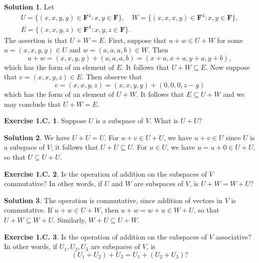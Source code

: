 \documentclass[12pt]{article}
\theoremstyle{definition}
\theoremstyle{exercise}
\newtheorem{exercise}{Exercise 1.C.}
\theoremstyle{solution}
\newtheorem*{solution}{Solution}
\newcommand{\F}{\mathbf{F}}
\begin{document}
\begin{solution}
    Let
    \begin{gather*}
        U = \{ (x, x, y, y) \in \F^4 : x, y \in \F \}, \quad W = \{ (x, x, x, y) \in \F^4 : x, y \in \F \}, \\
        E = \{ (x, x, y, z) \in \F^4 : x, y, z \in \F \}.
    \end{gather*}
    The assertion is that \( U + W = E \). First, suppose that \( u + w \in U + W \) for some \( u = (x, x, y, y) \in U \) and \( w = (a, a, a, b) \in W \). Then
    \[
        u + w = (x, x, y, y) + (a, a, a, b) = (x + a, x + a, y + a, y + b),
    \]
    which has the form of an element of \( E \). It follows that \( U + W \subseteq E \). Now suppose that \( v = (x, x, y, z) \in E \). Then observe that
    \[
        v = (x, x, y, z) = (x, x, y, y) + (0, 0, 0, z - y)
    \]
    which has the form of an element of \( U + W \). It follows that \( E \subseteq U + W \) and we may conclude that \( U + W = E \).
\end{solution}

\begin{exercise}
\label{ex:15}
    Suppose \( U \) is a subspace of \( V \). What is \( U + U \)?
\end{exercise}

\begin{solution}
    We have \( U + U = U \). For \( u + v \in U + U \), we have \( u + v \in U \) since \( U \) is a subspace of \( V \); it follows that \( U + U \subseteq U \). For \( u \in U \), we have \( u = u + 0 \in U + U \), so that \( U \subseteq U + U \).
\end{solution}

\begin{exercise}
\label{ex:16}
    Is the operation of addition on the subspaces of \( V \) commutative? In other words, if \( U \) and \( W \) are subspaces of \( V \), is \( U + W = W + U \)?
\end{exercise}

\begin{solution}
    The operation is commutative, since addition of vectors in \( V \) is commutative. If \( u + w \in U + W \), then \( u + w = w + u \in W + U \), so that \( U + W \subseteq W + U \). Similarly, \( W + U \subseteq U + W \).
\end{solution}

\begin{exercise}
\label{ex:17}
    Is the operation of addition on the subspaces of \( V \) associative? In other words, if \( U_1, U_2, U_3 \) are subspaces of \( V \), is
    \[
        (U_1 + U_2) + U_3 = U_1 + (U_2 + U_3)?
    \]
\end{exercise}
\end{document}
